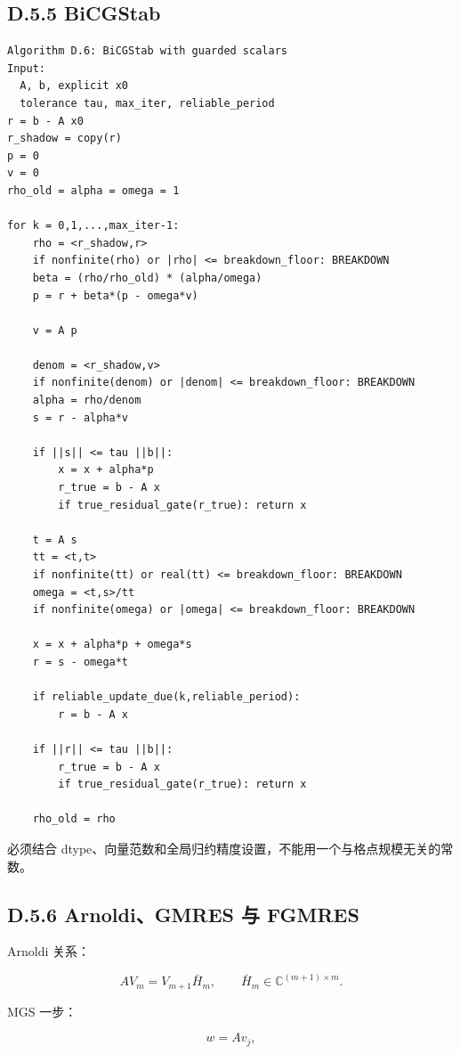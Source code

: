 \documentclass[UTF8,a4paper,10pt]{ctexart}
\DeclareRobustCommand{\pycode}[1]{\texorpdfstring{\texttt{\seqsplit{#1}}}{#1}}
\begin{document}
\subsection{D.5.5 BiCGStab}
\begin{Verbatim}[breaklines=true,breakanywhere=true,fontsize=\scriptsize]
Algorithm D.6: BiCGStab with guarded scalars
Input:
  A, b, explicit x0
  tolerance tau, max_iter, reliable_period
r = b - A x0
r_shadow = copy(r)
p = 0
v = 0
rho_old = alpha = omega = 1

for k = 0,1,...,max_iter-1:
    rho = <r_shadow,r>
    if nonfinite(rho) or |rho| <= breakdown_floor: BREAKDOWN
    beta = (rho/rho_old) * (alpha/omega)
    p = r + beta*(p - omega*v)

    v = A p

    denom = <r_shadow,v>
    if nonfinite(denom) or |denom| <= breakdown_floor: BREAKDOWN
    alpha = rho/denom
    s = r - alpha*v

    if ||s|| <= tau ||b||:
        x = x + alpha*p
        r_true = b - A x
        if true_residual_gate(r_true): return x

    t = A s
    tt = <t,t>
    if nonfinite(tt) or real(tt) <= breakdown_floor: BREAKDOWN
    omega = <t,s>/tt
    if nonfinite(omega) or |omega| <= breakdown_floor: BREAKDOWN

    x = x + alpha*p + omega*s
    r = s - omega*t

    if reliable_update_due(k,reliable_period):
        r = b - A x

    if ||r|| <= tau ||b||:
        r_true = b - A x
        if true_residual_gate(r_true): return x

    rho_old = rho
\end{Verbatim}
\pycode{breakdown\_floor} 必须结合 dtype、向量范数和全局归约精度设置，不能用一个与格点规模无关的常数。

\subsection{D.5.6 Arnoldi、GMRES 与 FGMRES}
Arnoldi 关系：

\begin{displaymath}
AV_m=V_{m+1}\bar H_m, \qquad \bar H_m\in\mathbb C^{(m+1)\times m}.
\end{displaymath}

MGS 一步：

\begin{displaymath}
w=Av_j,
\end{displaymath}
\end{document}
